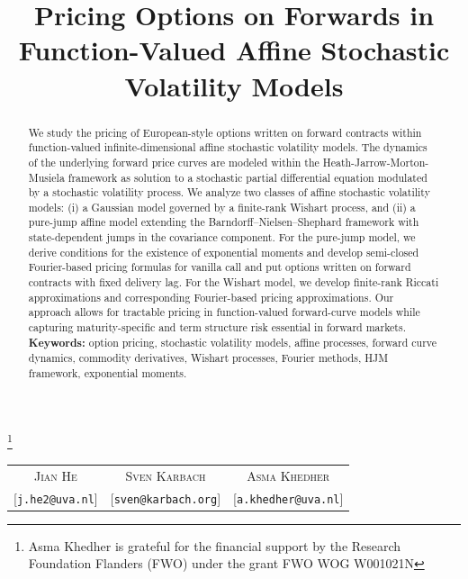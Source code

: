 \documentclass[10pt,a4paper,reqno]{amsart}
\author[#1]{#1\\{\small[\texttt{\MakeLowercase{#2}}]}}
\numberwithin{equation}{section}
\theoremstyle{plain}
\theoremstyle{definition}
\theoremstyle{example}
\newcommand\authoremail[2]{
  \author[#1]{#1\\{\small[\texttt{\MakeLowercase{#2}}]}}
}
\begin{document}
\title[Pricing Options on Forwards in Affine SV Models]{Pricing Options on Forwards in
Function-Valued Affine Stochastic Volatility Models} 
\address{\today{}, Korteweg-de Vries Institute for Mathematics at University of Amsterdam.}

\thanks{Asma Khedher is grateful for the financial support by the Research Foundation Flanders (FWO) under the grant FWO WOG W001021N}


\maketitle{}

\vspace{-3mm}
\begin{center}
  \begin{tabular}{ccc}
  \textsc{Jian He}  &  \textsc{Sven Karbach} &  \textsc{Asma Khedher}\\
  \small[\texttt{\MakeLowercase{j.he2@uva.nl}}] &    
   \small[\texttt{\MakeLowercase{sven@karbach.org}}] &
   \small[\texttt{\MakeLowercase{a.khedher@uva.nl}}]
  \end{tabular}
\end{center}


\begin{abstract}
We study the pricing of European-style options written on forward contracts within function-valued infinite-dimensional affine stochastic volatility models. The dynamics of the underlying forward price curves are modeled within the Heath-Jarrow-Morton-Musiela framework as solution to a stochastic partial differential equation modulated by a stochastic volatility process. We analyze two classes of affine stochastic volatility models: (i) a Gaussian model governed by a finite-rank Wishart process, and (ii) a pure-jump affine model extending the Barndorff–Nielsen–Shephard framework with state-dependent jumps in the covariance component. For the pure-jump model, we derive conditions for the existence of exponential moments and develop semi-closed Fourier-based pricing formulas for vanilla call and put options written on forward contracts with fixed delivery lag. For the Wishart model, we develop finite-rank Riccati approximations and corresponding Fourier-based pricing approximations. Our approach allows for tractable pricing in function-valued forward-curve models while capturing maturity-specific and term structure risk essential in forward markets.\\

\noindent \textbf{Keywords:} option pricing, stochastic volatility models, affine processes, forward curve dynamics, commodity derivatives, Wishart processes, Fourier methods, HJM framework, exponential moments.

\end{abstract}
\end{document}
